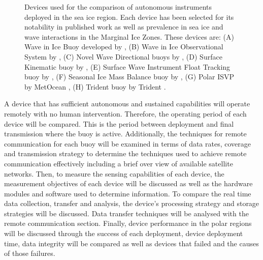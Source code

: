 \begin{figure}[H]
	\caption{ Devices used for the comparison of autonomous instruments deployed in the sea ice region. Each device has been selected for its notability in published work as well as prevalence in sea ice and wave interactions in the Marginal Ice Zones. These devices are: (A) Wave in Ice Buoy developed by \textcite{rabault2017measurements} \cite{rabault2017measurements}, (B) Wave in Ice Observational System by \textcite{kohout2015device} \cite{kohout2015device}, (C) Novel Wave Directional buoys by \textcite{doble2017robust} \cite{doble_wave_2015}, (D) Surface Kinematic buoy by \textcite{guimaraes2018surface} \cite{guimaraes2018surface}, (E) Surface Wave Instrument Float Tracking buoy by \textcite{thomson2012wave}  \cite{jim_swift_2012}, (F) Seasonal Ice Mass Balance buoy by \textcite{polashenski2011seasonal} \cite{simbpic}, (G) Polar ISVP  by MetOcean \cite{uptempo}, (H) Trident buoy by Trident \cite{trident}.}
	\label{fig:buoys}
\end{figure}


A device that has sufficient autonomous and sustained capabilities will operate remotely with no human intervention. Therefore, the operating period of each device will be compared. This is the period between deployment and final transmission where the buoy is active. Additionally, the techniques for remote communication for each buoy will be examined in terms of data rates, coverage and transmission strategy to determine the techniques used to achieve remote communication effectively including a brief over view of available satellite networks. Then, to measure the sensing capabilities of each device, the measurement objectives of each device will be discussed as well as the hardware modules and software used to determine information. To compare the real time data collection, transfer and analysis, the device's processing strategy and storage strategies will be discussed. Data transfer techniques will be analysed with the remote communication section. Finally, device performance in the polar regions will be discussed through the success of each deployment, device deployment time, data integrity will be compared as well as devices that failed and the causes of those failures.

